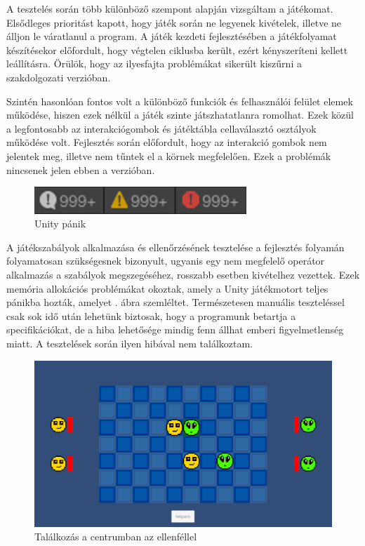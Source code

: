 \documentclass[
]{thesis-ekf}
\theoremstyle{definition}
\theoremstyle{remark}
\begin{document}
A tesztelés során több különböző szempont alapján vizsgáltam a játékomat. Elsődleges prioritást kapott, hogy játék során ne legyenek kivételek, illetve ne álljon le váratlanul a program. A játék kezdeti fejlesztésében a játékfolyamat készítésekor előfordult, hogy végtelen ciklusba került, ezért kényszeríteni kellett leállításra. Örülök, hogy az ilyesfajta problémákat sikerült kiszűrni a szakdolgozati verzióban.


Szintén hasonlóan fontos volt a különböző funkciók és felhasználói felület elemek működése, hiszen ezek nélkül a játék szinte játszhatatlanra romolhat. Ezek közül a legfontosabb az interakciógombok és játéktábla cellaválasztó osztályok működése volt. Fejlesztés során előfordult, hogy az interakció gombok nem jelentek meg, illetve nem tűntek el a körnek megfelelően. Ezek a problémák nincsenek jelen ebben a verzióban.

\begin{figure}[h!]
	\centering
	\includegraphics[width=8cm]{./pictures/game_error.png}
	\caption{Unity pánik}
	\label{error}
\end{figure}

A játékszabályok alkalmazása és ellenőrzésének tesztelése a fejlesztés folyamán folyamatosan szükségesnek bizonyult, ugyanis egy nem megfelelő operátor alkalmazás a szabályok megszegéséhez, rosszabb esetben kivételhez vezettek. Ezek memória allokációs problémákat okoztak, amely a Unity játékmotort teljes pánikba hozták, amelyet . ábra szemléltet. Természetesen manuális teszteléssel csak sok idő után lehetünk biztosak, hogy a programunk betartja a specifikációkat, de a hiba lehetősége mindig fenn állhat emberi figyelmetlenség miatt. A tesztelések során ilyen hibával nem találkoztam.

\begin{figure}[h!]
	\centering
	\includegraphics[width=16cm]{./pictures/game_situation1.png}
	\caption{Találkozás a centrumban az ellenféllel}
	\label{game-situation-1}
\end{figure}
\end{document}
